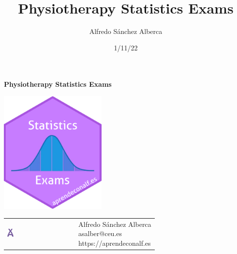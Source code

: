 \documentclass[
  a4paper,
]{scrreport}
\title{Physiotherapy Statistics Exams}
\author{Alfredo Sánchez Alberca}
\date{1/11/22}
\renewcommand*\contentsname{Table of contents}
\newcommand\contentsname{Table of contents}
\theoremstyle{definition}
\theoremstyle{remark}
\begin{document}
\begin{titlepage}

\begin{center}
\vspace*{5cm}

\Huge
{\textbf{\textsf{Physiotherapy Statistics Exams}}}

\vspace{0.5cm}
\LARGE
{\textbf{\textsf{}}}

\vspace{1.5cm}

\includegraphics[width=0.4\textwidth]{img/logos/sticker.png}
\end{center}

\vfill

\begin{flushleft}
\begin{tabular}{ll}
\includegraphics[width=0.1\textwidth]{img/logos/aprendeconalf.png} & \parbox[b]{5cm}{\Large\textsf{Alfredo
Sánchez
Alberca}\\ \textsf{asalber@ceu.es} \\ \textsf{https://aprendeconalf.es}}
\end{tabular}
\end{flushleft}
\end{titlepage}\ifdefined\Shaded\renewenvironment{Shaded}{\begin{tcolorbox}[enhanced, frame hidden, borderline west={3pt}{0pt}{shadecolor}, breakable, sharp corners, boxrule=0pt, interior hidden]}{\end{tcolorbox}}\fi

\renewcommand*\contentsname{Table of contents}
{
\hypersetup{linkcolor=}
\setcounter{tocdepth}{2}
\tableofcontents
}
\end{document}
